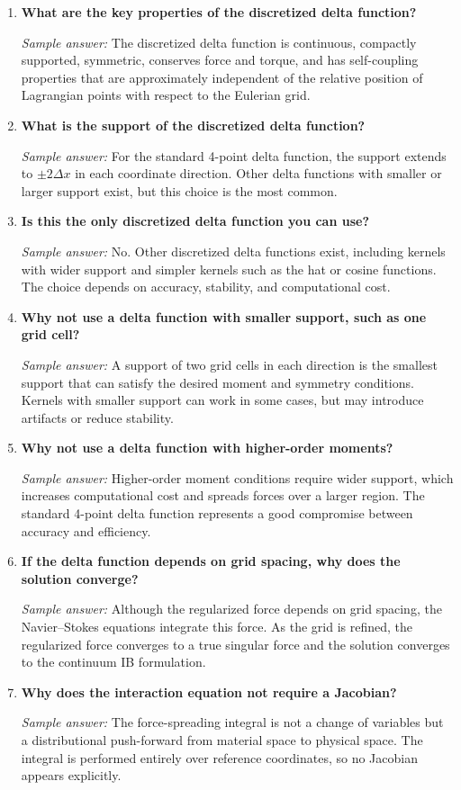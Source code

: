 \documentclass[11pt]{article}
\begin{document}
\begin{enumerate}[label=\arabic*.]
\item \textbf{What are the key properties of the discretized delta function?}

\textit{Sample answer:}  
The discretized delta function is continuous, compactly supported, symmetric, conserves force and torque, and has self-coupling properties that are approximately independent of the relative position of Lagrangian points with respect to the Eulerian grid.

\item \textbf{What is the support of the discretized delta function?}

\textit{Sample answer:}  
For the standard 4-point delta function, the support extends to $\pm 2\Delta x$ in each coordinate direction. Other delta functions with smaller or larger support exist, but this choice is the most common.

\item \textbf{Is this the only discretized delta function you can use?}

\textit{Sample answer:}  
No. Other discretized delta functions exist, including kernels with wider support and simpler kernels such as the hat or cosine functions. The choice depends on accuracy, stability, and computational cost.

\item \textbf{Why not use a delta function with smaller support, such as one grid cell?}

\textit{Sample answer:}  
A support of two grid cells in each direction is the smallest support that can satisfy the desired moment and symmetry conditions. Kernels with smaller support can work in some cases, but may introduce artifacts or reduce stability.

\item \textbf{Why not use a delta function with higher-order moments?}

\textit{Sample answer:}  
Higher-order moment conditions require wider support, which increases computational cost and spreads forces over a larger region. The standard 4-point delta function represents a good compromise between accuracy and efficiency.

\item \textbf{If the delta function depends on grid spacing, why does the solution converge?}

\textit{Sample answer:}  
Although the regularized force depends on grid spacing, the Navier--Stokes equations integrate this force. As the grid is refined, the regularized force converges to a true singular force and the solution converges to the continuum IB formulation.

\item \textbf{Why does the interaction equation not require a Jacobian?}

\textit{Sample answer:}  
The force-spreading integral is not a change of variables but a distributional push-forward from material space to physical space. The integral is performed entirely over reference coordinates, so no Jacobian appears explicitly.

\end{enumerate}
\end{document}
